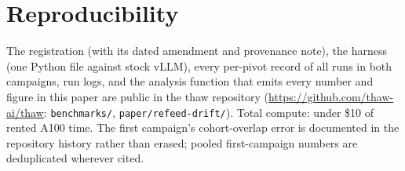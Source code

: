 \documentclass[11pt]{article}
\begin{document}
\section{Reproducibility}

The registration (with its dated amendment and provenance note), the
harness (one Python file against stock vLLM), every per-pivot record of all
runs in both campaigns, run logs, and the analysis function that emits
every number and figure in this paper are public in the thaw repository
(\url{https://github.com/thaw-ai/thaw}: \texttt{benchmarks/},
\texttt{paper/refeed-drift/}). Total compute: under \$10 of rented A100
time. The first campaign's cohort-overlap error is documented in the
repository history rather than erased; pooled first-campaign numbers are
deduplicated wherever cited.



\end{document}
